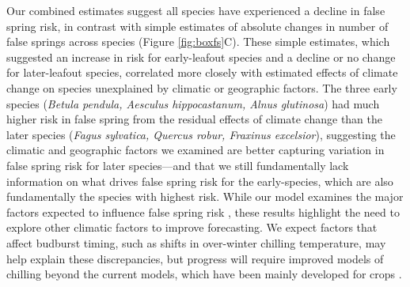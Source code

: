 \documentclass{article}\usepackage[]{graphicx}\usepackage[]{color}
\begin{document}
Our combined estimates suggest all species have experienced a decline in false spring risk, in contrast with simple estimates of absolute changes in number of false springs across species (Figure \ref{fig:boxfs}C).  These simple estimates, which suggested an increase in risk for early-leafout species and a decline or no change for later-leafout species, correlated more closely with estimated effects of climate change on species unexplained by climatic or geographic factors. The three early species (\textit{Betula pendula, Aesculus hippocastanum, Alnus glutinosa}) had much higher risk in false spring from the residual effects of climate change than the later species (\textit{Fagus sylvatica, Quercus robur, Fraxinus excelsior}), suggesting the climatic and geographic factors we examined are better capturing variation in false spring risk for later species---and that we still fundamentally lack information on what drives false spring risk for the early-species, which are also fundamentally the species with highest risk. While our model examines the major factors expected to influence false spring risk \citep{Liu2018,Ma2018,Vitasse2018,Wypych2016a}, these results highlight the need to explore other climatic factors to improve forecasting. We expect factors that affect budburst timing, such as shifts in over-winter chilling temperature, may help explain these discrepancies, but progress will require improved models of chilling beyond the current models, which have been mainly developed for crops \citep{Luedeling2011,Dennis2003}. 

\end{document}
